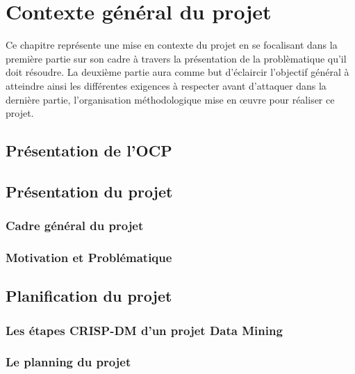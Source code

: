 \chapter{Contexte général du projet}

Ce chapitre représente une mise en contexte du projet en se focalisant dans la première partie sur son cadre à travers la présentation de la problèmatique qu'il doit résoudre. La deuxième partie aura comme but d'éclaircir l'objectif général à atteindre ainsi les différentes exigences à respecter avant d'attaquer dans la dernière partie, l'organisation méthodologique mise en œuvre pour réaliser ce projet.

\section{Présentation de l’OCP}

	
\section{Présentation du projet}
	\subsection{Cadre général du projet}
	\subsection{Motivation et Problématique}


\section{Planification du projet}
	\subsection{Les étapes CRISP-DM d'un projet Data Mining}
	\subsection{Le planning du projet}